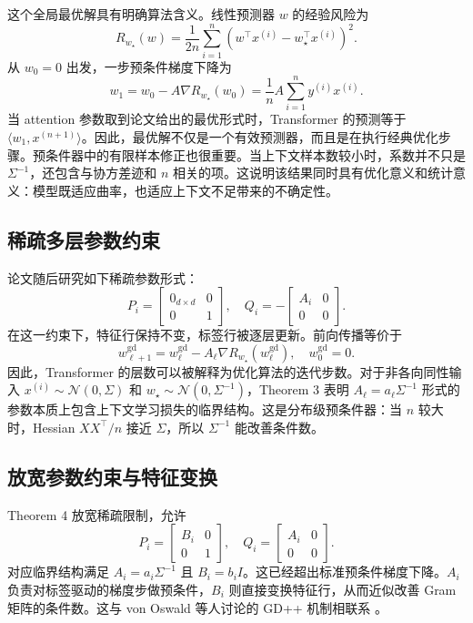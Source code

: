 \documentclass[conference]{IEEEtran}
\newcommand{\N}{\mathcal{N}}
\newcommand{\wstar}{w_\star}
\begin{document}
这个全局最优解具有明确算法含义。线性预测器 $w$ 的经验风险为
\begin{equation}
R_{\wstar}(w)=\frac{1}{2n}\sum_{i=1}^n (w^\top x^{(i)}-\wstar^\top x^{(i)})^2.
\end{equation}
从 $w_0=0$ 出发，一步预条件梯度下降为
\begin{equation}
w_1=w_0-A\nabla R_{\wstar}(w_0)
=\frac{1}{n}A\sum_{i=1}^n y^{(i)}x^{(i)}.
\end{equation}
当 attention 参数取到论文给出的最优形式时，Transformer 的预测等于 $\langle w_1,x^{(n+1)}\rangle$。因此，最优解不仅是一个有效预测器，而且是在执行经典优化步骤。预条件器中的有限样本修正也很重要。当上下文样本数较小时，系数并不只是 $\Sigma^{-1}$，还包含与协方差迹和 $n$ 相关的项。这说明该结果同时具有优化意义和统计意义：模型既适应曲率，也适应上下文不足带来的不确定性。

\subsection{稀疏多层参数约束}
论文随后研究如下稀疏参数形式：
\begin{equation}
P_i =
\begin{bmatrix}
0_{d\times d} & 0\\
0 & 1
\end{bmatrix},
\quad
Q_i =
-
\begin{bmatrix}
A_i & 0\\
0 & 0
\end{bmatrix}.
\end{equation}
在这一约束下，特征行保持不变，标签行被逐层更新。前向传播等价于
\begin{equation}
w_{\ell+1}^{\mathrm{gd}} =
w_\ell^{\mathrm{gd}} - A_\ell \nabla R_{\wstar}(w_\ell^{\mathrm{gd}}),
\quad w_0^{\mathrm{gd}}=0.
\end{equation}
因此，Transformer 的层数可以被解释为优化算法的迭代步数。对于非各向同性输入 $x^{(i)}\sim\N(0,\Sigma)$ 和 $\wstar\sim\N(0,\Sigma^{-1})$，Theorem 3 表明 $A_\ell=a_\ell\Sigma^{-1}$ 形式的参数本质上包含上下文学习损失的临界结构。这是分布级预条件器：当 $n$ 较大时，Hessian $XX^\top/n$ 接近 $\Sigma$，所以 $\Sigma^{-1}$ 能改善条件数。

\subsection{放宽参数约束与特征变换}
Theorem 4 放宽稀疏限制，允许
\begin{equation}
P_i =
\begin{bmatrix}
B_i & 0\\
0 & 1
\end{bmatrix},
\quad
Q_i =
\begin{bmatrix}
A_i & 0\\
0 & 0
\end{bmatrix}.
\end{equation}
对应临界结构满足 $A_i=a_i\Sigma^{-1}$ 且 $B_i=b_iI$。这已经超出标准预条件梯度下降。$A_i$ 负责对标签驱动的梯度步做预条件，$B_i$ 则直接变换特征行，从而近似改善 Gram 矩阵的条件数。这与 von Oswald 等人讨论的 GD++ 机制相联系 \cite{von2023transformers}。
\end{document}
